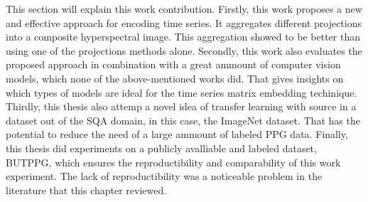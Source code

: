 This section will explain this work contribution. Firstly, this work proposes a new and effective approach for encoding time series. It aggregates different projections into a composite hyperspectral image. This aggregation showed to be better than using one of the projections methods alone. Secondly, this work also evaluates the proposed approach in combination with a great ammount of computer vision models, which none of the above-mentioned works did. That gives insights on which types of models are ideal for the time series matrix embedding techinique. Thirdly, this thesis also attemp a novel idea of transfer learning with source in a dataset out of the \gls{SQA} domain, in this case, the ImageNet dataset. That has the potential to reduce the need of a large ammount of labeled \gls{PPG} data. Finally, this thesis did experiments on a publicly avalliable and labeled dataset, \gls{BUTPPG}, which ensures the reproductibility and comparability of this work experiment. The lack of reproductibility was a noticeable problem in the literature that this chapter reviewed.     
